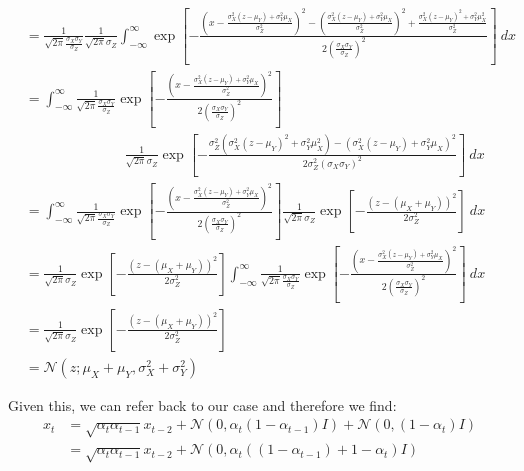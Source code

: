 \documentclass[twoside]{article}
\numberwithin{equation}{section}
\numberwithin{figure}{section}
\begin{document}
{\begin{align*}
  &= \frac{1}{\sqrt{2 \pi} \frac{\sigma_X \sigma_Y}{\sigma_Z}} \frac{1}{\sqrt{2 \pi} \sigma_Z} \int_{-\infty}^{\infty} \exp\left[{-\frac{\left( x - \frac{\sigma_X^2 (z - \mu_Y) + \sigma_Y^2 \mu_X}{\sigma_Z^2}\right)^2 - \left( \frac{\sigma_X^2 (z - \mu_Y) + \sigma_Y^2 \mu_X}{\sigma_Z^2} \right)^2 + \frac{\sigma_X^2 (z - \mu_Y)^2 + \sigma_Y^2 \mu_X^2}{\sigma_Z^2}}{2 \left(\frac{\sigma_X \sigma_Y}{\sigma_Z}\right)^2}} \right] \: dx  \\[10pt]
  &= \int_{-\infty}^{\infty} \frac{1}{\sqrt{2 \pi} \frac{\sigma_X \sigma_Y}{\sigma_Z}} \exp\left[{-\frac{\left( x - \frac{\sigma_X^2 (z - \mu_Y) + \sigma_Y^2 \mu_X}{\sigma_Z^2}\right)^2}{2 \left(\frac{\sigma_X \sigma_Y}{\sigma_Z}\right)^2}} \right] \\[10pt]
  & \hspace{3cm} \frac{1}{\sqrt{2 \pi} \sigma_Z} \exp \left[ - \frac{\sigma_Z^2 \left( \sigma_X^2 (z - \mu_Y)^2 + \sigma_Y^2 \mu_X^2 \right) - \left( \sigma_X^2 (z - \mu_Y) + \sigma_Y^2 \mu_X \right)^2}{2 \sigma_Z^2 (\sigma_X \sigma_Y)^2} \right] \: dx  \\[10pt]
  &= \int_{-\infty}^{\infty} \frac{1}{\sqrt{2 \pi} \frac{\sigma_X \sigma_Y}{\sigma_Z}} \exp\left[{-\frac{\left( x - \frac{\sigma_X^2 (z - \mu_Y) + \sigma_Y^2 \mu_X}{\sigma_Z^2}\right)^2}{2 \left(\frac{\sigma_X \sigma_Y}{\sigma_Z}\right)^2}} \right] \frac{1}{\sqrt{2 \pi} \sigma_Z} \exp \left[ - \frac{(z - (\mu_X + \mu_Y))^2}{2 \sigma_Z^2} \right] \: dx  \\[10pt]
  &= \frac{1}{\sqrt{2 \pi} \sigma_Z} \exp \left[ - \frac{(z - (\mu_X + \mu_Y))^2}{2 \sigma_Z^2} \right] \int_{-\infty}^{\infty} \frac{1}{\sqrt{2 \pi} \frac{\sigma_X \sigma_Y}{\sigma_Z}} \exp\left[{-\frac{\left( x - \frac{\sigma_X^2 (z - \mu_Y) + \sigma_Y^2 \mu_X}{\sigma_Z^2}\right)^2}{2 \left(\frac{\sigma_X \sigma_Y}{\sigma_Z}\right)^2}} \right] \: dx  \\[10pt]
  &= \frac{1}{\sqrt{2 \pi} \sigma_Z} \exp \left[ - \frac{(z - (\mu_X + \mu_Y))^2}{2 \sigma_Z^2} \right] \\[10pt]
  &= \mathcal{N}\left(z; \mu_X + \mu_Y, \sigma_X^2 + \sigma_Y^2 \right)
\end{align*}
}

Given this, we can refer back to our case and therefore we find:
\begin{align*}
  x_t &= \sqrt{\alpha_t \alpha_{t-1}} x_{t-2} + \mathcal{N}\left(0, \alpha_t\left(1 - \alpha_{t-1}\right)I \right) + \mathcal{N}\left(0, (1 - \alpha_t) I \right) \\
  &= \sqrt{\alpha_t \alpha_{t-1}} x_{t-2} + \mathcal{N}\left(0, \alpha_t \left((1 - \alpha_{t-1}) + 1 - \alpha_t \right)I \right) 
\end{align*}

\newpage
\printbibliography
\end{document}
